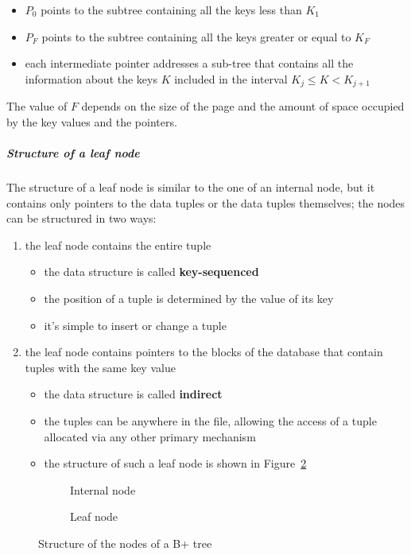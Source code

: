 \documentclass[english]{article}
\begin{document}
\begin{itemize}
  \item \(P_0\) points to the subtree containing all the keys less than \(K_1\)
  \item \(P_F\) points to the subtree containing all the keys greater or equal to \(K_F\)
  \item each intermediate pointer addresses a sub-tree that contains all the information about the keys \(K\) included in the interval \(K_j \leq K < K_{j + 1}\)
\end{itemize}

The value of \(F\) depends on the size of the page and the amount of space occupied by the key values and the pointers.

\subparagraph*{Structure of a leaf node}
The structure of a leaf node is similar to the one of an internal node, but it contains only pointers to the data tuples or the data tuples themselves;
the nodes can be structured in two ways:

\begin{enumerate}
  \item the leaf node contains the entire tuple
        \begin{itemize}
          \item the data structure is called \textbf{key-sequenced}
          \item the position of a tuple is determined by the value of its key
          \item it's simple to insert or change a tuple
        \end{itemize}
  \item the leaf node contains pointers to the blocks of the database that contain tuples with the same key value
        \begin{itemize}
          \item the data structure is called \textbf{indirect}
          \item the tuples can be anywhere in the file, allowing the access of a tuple allocated via any other primary mechanism
          \item the structure of such a leaf node is shown in Figure~\ref{subfig:b-tree-leaf-node}
        \end{itemize}
\end{enumerate}

\begin{figure}[htbp]
  \centering
  \bigskip
  \begin{subfigure}{0.99\textwidth}
    \centering
    \bigskip
    \caption{Internal node}
    \label{subfig:b-tree-internal-node}
    \bigskip
  \end{subfigure}
  \bigskip
  \begin{subfigure}{0.99\textwidth}
    \centering
    \bigskip
    \caption{Leaf node}
    \label{subfig:b-tree-leaf-node}
    \bigskip
  \end{subfigure}
  \caption{Structure of the nodes of a B+ tree}
  \label{fig:b-tree-structure}
\end{figure}
\end{document}
